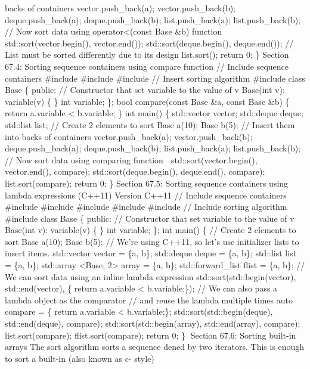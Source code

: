 backs of containers vector.push\_back(a); vector.push\_back(b); 
deque.push\_back(a); deque.push\_back(b); list.push\_back(a);
list.push\_back(b); // Now sort data using operator\textless(const Base
\&b) function std::sort(vector.begin(), vector.end());
std::sort(deque.begin(), deque.end()); // List must be sorted
differently due to its design list.sort(); return 0; \} Section 67.4:
Sorting sequence containers using compare function // Include sequence
containers \#include \#include \#include // Insert sorting algorithm
\#include class Base \{ public: // Constructor that set variable to the
value of v Base(int v): variable(v) \{ \} int variable; \}; bool
compare(const Base \&a, const Base \&b) \{ return a.variable \textless{}
b.variable; \} int main() \{ std::vector vector; std::deque deque;
std::list list; // Create 2 elements to sort Base a(10); Base b(5); //
Insert them into backs of containers vector.push\_back(a);
vector.push\_back(b); deque.push\_back(a); deque.push\_back(b);
list.push\_back(a); list.push\_back(b); // Now sort data using comparing
function  std::sort(vector.begin(), vector.end(), compare);
std::sort(deque.begin(), deque.end(), compare); list.sort(compare);
return 0; \} Section 67.5: Sorting sequence containers using lambda
expressions (C++11) Version C++11 // Include sequence containers
\#include \#include \#include \#include \#include // Include sorting
algorithm \#include class Base \{ public: // Constructor that set
variable to the value of v Base(int v): variable(v) \{ \} int variable;
\}; int main() \{ // Create 2 elements to sort Base a(10); Base b(5); //
We're using C++11, so let's use initializer lists to insert items.
std::vector vector = \{a, b\}; std::deque deque = \{a, b\}; std::list
list = \{a, b\}; std::array \textless Base, 2\textgreater{} array = \{a,
b\}; std::forward\_list flist = \{a, b\}; // We can sort data using an
inline lambda expression std::sort(std::begin(vector), std::end(vector),
\href{const\%20Base\%20\&a,\%20const\%20Base\%20\&b}{} \{ return
a.variable \textless{} b.variable;\}); // We can also pass a lambda
object as the comparator // and reuse the lambda multiple times auto
compare = \href{const\%20Base\%20\&a,\%20const\%20Base\%20\&b}{} \{
return a.variable \textless{} b.variable;\};
std::sort(std::begin(deque), std::end(deque), compare);
std::sort(std::begin(array), std::end(array), compare);
list.sort(compare); flist.sort(compare); return 0; \} Section 67.6:
Sorting built-in arrays The sort algorithm sorts a sequence dened by two
iterators. This is enough to sort a built-in (also known as c- style)
